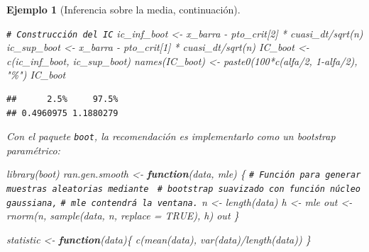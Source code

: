 \documentclass[
]{book}
\newenvironment{Shaded}{\begin{snugshade}}{\end{snugshade}}
\newcommand{\AttributeTok}[1]{\textcolor[rgb]{0.77,0.63,0.00}{#1}}
\newcommand{\CommentTok}[1]{\textcolor[rgb]{0.56,0.35,0.01}{\textit{#1}}}
\newcommand{\ConstantTok}[1]{\textcolor[rgb]{0.00,0.00,0.00}{#1}}
\newcommand{\ControlFlowTok}[1]{\textcolor[rgb]{0.13,0.29,0.53}{\textbf{#1}}}
\newcommand{\DecValTok}[1]{\textcolor[rgb]{0.00,0.00,0.81}{#1}}
\newcommand{\FunctionTok}[1]{\textcolor[rgb]{0.00,0.00,0.00}{#1}}
\newcommand{\NormalTok}[1]{#1}
\newcommand{\OtherTok}[1]{\textcolor[rgb]{0.56,0.35,0.01}{#1}}
\newcommand{\SpecialCharTok}[1]{\textcolor[rgb]{0.00,0.00,0.00}{#1}}
\newcommand{\StringTok}[1]{\textcolor[rgb]{0.31,0.60,0.02}{#1}}
\theoremstyle{break}
\newtheorem{example}{Ejemplo}[chapter]
\theoremstyle{nonumberplain}
\renewcommand{\CommentTok}[1]{\textcolor[rgb]{0.41,0.41,0.41}{\texttt{#1}}}
\begin{document}
\begin{example}[Inferencia sobre la media, continuación]
\begin{Shaded}
\begin{Highlighting}[]
\CommentTok{\# Construcción del IC}
\NormalTok{ic\_inf\_boot }\OtherTok{\textless{}{-}}\NormalTok{ x\_barra }\SpecialCharTok{{-}}\NormalTok{ pto\_crit[}\DecValTok{2}\NormalTok{] }\SpecialCharTok{*}\NormalTok{ cuasi\_dt}\SpecialCharTok{/}\FunctionTok{sqrt}\NormalTok{(n)}
\NormalTok{ic\_sup\_boot }\OtherTok{\textless{}{-}}\NormalTok{ x\_barra }\SpecialCharTok{{-}}\NormalTok{ pto\_crit[}\DecValTok{1}\NormalTok{] }\SpecialCharTok{*}\NormalTok{ cuasi\_dt}\SpecialCharTok{/}\FunctionTok{sqrt}\NormalTok{(n)}
\NormalTok{IC\_boot }\OtherTok{\textless{}{-}} \FunctionTok{c}\NormalTok{(ic\_inf\_boot, ic\_sup\_boot)}
\FunctionTok{names}\NormalTok{(IC\_boot) }\OtherTok{\textless{}{-}} \FunctionTok{paste0}\NormalTok{(}\DecValTok{100}\SpecialCharTok{*}\FunctionTok{c}\NormalTok{(alfa}\SpecialCharTok{/}\DecValTok{2}\NormalTok{, }\DecValTok{1}\SpecialCharTok{{-}}\NormalTok{alfa}\SpecialCharTok{/}\DecValTok{2}\NormalTok{), }\StringTok{"\%"}\NormalTok{)}
\NormalTok{IC\_boot}
\end{Highlighting}
\end{Shaded}

\begin{verbatim}
##      2.5%     97.5% 
## 0.4960975 1.1880279
\end{verbatim}

Con el paquete \texttt{boot}, la recomendación es implementarlo como
un bootstrap paramétrico:

\begin{Shaded}
\begin{Highlighting}[]
\FunctionTok{library}\NormalTok{(boot)}
\NormalTok{ran.gen.smooth }\OtherTok{\textless{}{-}} \ControlFlowTok{function}\NormalTok{(data, mle) \{}
    \CommentTok{\# Función para generar muestras aleatorias mediante }
    \CommentTok{\# bootstrap suavizado con función núcleo gaussiana,}
    \CommentTok{\# mle contendrá la ventana.}
\NormalTok{    n }\OtherTok{\textless{}{-}} \FunctionTok{length}\NormalTok{(data)}
\NormalTok{    h }\OtherTok{\textless{}{-}}\NormalTok{ mle}
\NormalTok{    out }\OtherTok{\textless{}{-}} \FunctionTok{rnorm}\NormalTok{(n, }\FunctionTok{sample}\NormalTok{(data, n, }\AttributeTok{replace =} \ConstantTok{TRUE}\NormalTok{), h)}
\NormalTok{    out}
\NormalTok{\}}

\NormalTok{statistic }\OtherTok{\textless{}{-}} \ControlFlowTok{function}\NormalTok{(data)\{}
    \FunctionTok{c}\NormalTok{(}\FunctionTok{mean}\NormalTok{(data), }\FunctionTok{var}\NormalTok{(data)}\SpecialCharTok{/}\FunctionTok{length}\NormalTok{(data))}
\NormalTok{\}}


\end{Highlighting}
\end{Shaded}
\end{example}
\end{document}
